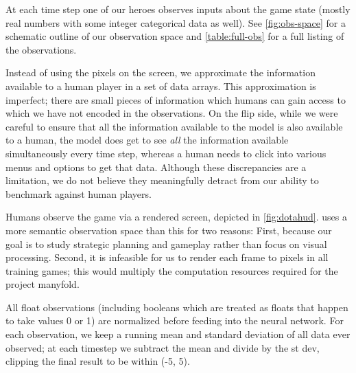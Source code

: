 \documentclass[ocean-paper.tex]{subfiles}
\begin{document}
At each time step one of our heroes observes \obssize inputs about the game state (mostly real numbers with some integer categorical data as well). 
See \autoref{fig:obs-space} for a schematic outline of our observation space and \autoref{table:full-obs} for a full listing of the observations. 

Instead of using the pixels on the screen, we approximate the information available to a human player in a set of data arrays. 
This approximation is imperfect; there are small pieces of information which humans can gain access to which we have not encoded in the observations. 
On the flip side, while we were careful to ensure that all the information available to the model is also available to a human, the model does get to see \emph{all} the information available simultaneously every time step, whereas a human needs to click into various menus and options to get that data. 
Although these discrepancies are a limitation, we do not believe they meaningfully detract from our ability to benchmark against human players.

Humans observe the game via a rendered screen, depicted in \autoref{fig:dotahud}. 
\openaifive uses a more semantic observation space than this for two reasons: First, because our goal is to study strategic planning and gameplay rather than focus on visual processing. 
Second, it is infeasible for us to render each frame to pixels in all training games; this would multiply the computation resources required for the project manyfold.

All float observations (including booleans which are treated as floats that happen to take values 0 or 1) are normalized before feeding into the neural network. For each observation, we keep a running mean and standard deviation of all data ever observed; at each timestep we subtract the mean and divide by the st dev, clipping the final result to be within (-5, 5). 
\end{document}
